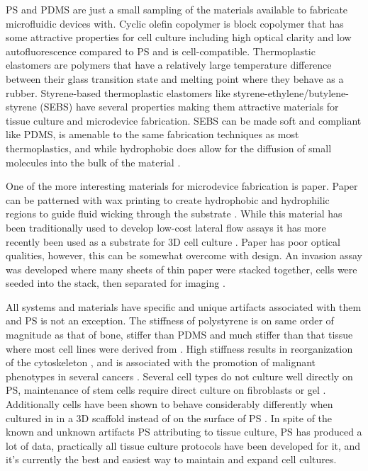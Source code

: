 PS and PDMS are just a small sampling of the materials available to fabricate microfluidic devices with. Cyclic olefin copolymer is block copolymer that has some attractive properties for cell culture including high optical clarity and low autofluorescence compared to PS and is cell-compatible\cite{Young2012, VanMidwoud2012}. Thermoplastic elastomers are polymers that have a relatively large temperature difference between their glass transition state and melting point where they behave as a rubber. Styrene-based thermoplastic elastomers like styrene-ethylene/butylene-styrene (SEBS) have several properties making them attractive materials for tissue culture and microdevice fabrication. SEBS can be made soft and compliant like PDMS, is amenable to the same fabrication techniques as most thermoplastics, and while hydrophobic does allow for the diffusion of small molecules into the bulk of the material \cite{Borysiak2013b, Borysiak2013,Roy2011,Guillemette2011,Guillemette2009,Li2013a}.

One of the more interesting materials for microdevice fabrication is paper. Paper can be patterned with wax printing to create hydrophobic and hydrophilic regions to guide fluid wicking through the substrate \cite{Carrilho2009}. While this material has been traditionally used to develop low-cost lateral flow assays it has more recently been used as a substrate for 3D cell culture \cite{Derda2009}. Paper has poor optical qualities, however, this can be somewhat overcome with design. An invasion assay was developed where many sheets of thin paper were stacked together, cells were seeded into the stack, then separated for imaging \cite{Derda2011}.

All systems and materials have specific and unique artifacts associated with them and PS is not an exception. The stiffness of polystyrene is on same order of magnitude as that of bone, stiffer than PDMS and much stiffer than that tissue where most cell lines were derived from \cite{Saha2008SubstrateBehavior}. High stiffness results in reorganization of the cytoskeleton \cite{Discher2005TissueSubstrate.}, and is associated with the promotion of malignant phenotypes in several cancers \cite{Paszek2005TensionalPhenotype, Seo2015, Verbridge2010Tissue-engineeredAngiogenesis.}. Several cell types do not culture well directly on PS, maintenance of stem cells require direct culture on fibroblasts or gel \cite{Okita2007, Xu2001}. Additionally cells have been shown to behave considerably differently when cultured in in a 3D scaffold instead of on the surface of PS \cite{Cukierman2001, Pampaloni2007TheTissue, Sung2013}. In spite of the known and unknown artifacts PS attributing to tissue culture, PS has produced a lot of data, practically all tissue culture protocols have been developed for it, and it's currently the best and easiest way to maintain and expand cell cultures.

